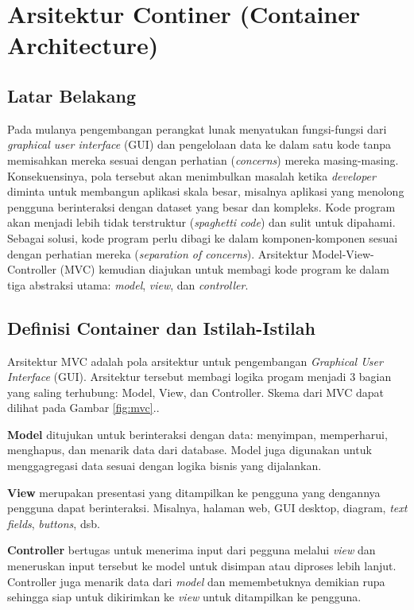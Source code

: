 \chapter{Arsitektur Continer (Container Architecture)}

\section{Latar Belakang}
Pada mulanya pengembangan perangkat lunak menyatukan fungsi-fungsi dari \textit{graphical user interface} (GUI) dan pengelolaan data ke dalam satu kode tanpa memisahkan mereka sesuai dengan perhatian (\textit{concerns}) mereka masing-masing. 
Konsekuensinya, pola tersebut akan menimbulkan masalah ketika \textit{developer} diminta untuk membangun aplikasi  skala besar,  misalnya aplikasi yang menolong pengguna berinteraksi dengan dataset yang besar dan kompleks. Kode program akan menjadi lebih tidak terstruktur (\textit{spaghetti code}) dan sulit untuk dipahami. 
Sebagai solusi, kode program perlu dibagi ke dalam komponen-komponen sesuai dengan perhatian mereka (\textit{separation of concerns}). 
Arsitektur Model-View-Controller (MVC) kemudian diajukan untuk membagi kode program ke dalam tiga abstraksi utama: \textit{model}, \textit{view}, dan \textit{controller}.

\section{Definisi Container dan Istilah-Istilah}
Arsitektur MVC adalah pola arsitektur untuk pengembangan \textit{Graphical User Interface} (GUI). Arsitektur tersebut membagi logika progam menjadi 3 bagian yang saling terhubung: Model, View, dan Controller. Skema dari MVC dapat dilihat pada Gambar \ref{fig:mvc}..

\textbf{Model} ditujukan untuk berinteraksi dengan data: menyimpan, memperharui, menghapus, dan menarik data dari database. Model juga digunakan untuk menggagregasi data sesuai dengan logika bisnis yang dijalankan. 

\textbf{View} merupakan presentasi yang ditampilkan ke pengguna yang dengannya pengguna dapat berinteraksi. Misalnya, halaman web, GUI desktop, diagram, \textit{text fields}, \textit{buttons}, dsb.

\textbf{Controller} bertugas untuk menerima input dari pegguna melalui \textit{view} dan meneruskan input tersebut ke model untuk disimpan atau diproses lebih lanjut. Controller juga menarik data dari \textit{model} dan memembetuknya demikian rupa sehingga siap untuk dikirimkan ke \textit{view} untuk ditampilkan ke pengguna.

